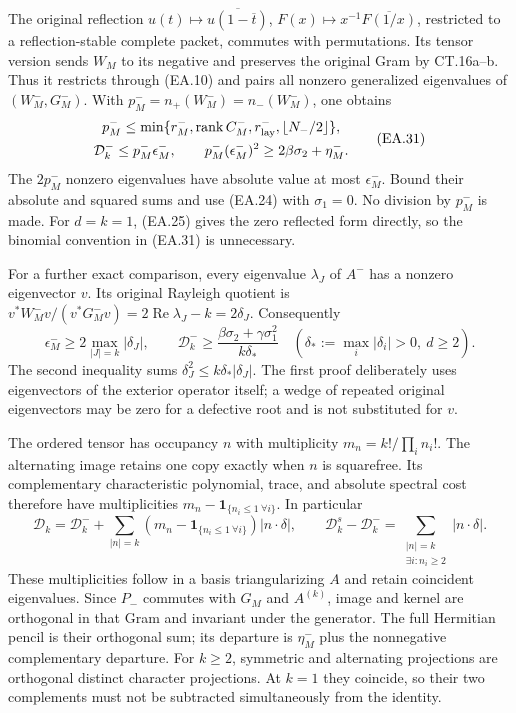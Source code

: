 The original reflection \(u(t)\mapsto\overline{u(1-\overline t)}\),
\(F(x)\mapsto x^{-1}\overline{F(1/x)}\), restricted to a
reflection-stable complete packet, commutes with permutations.  Its
tensor version sends \(W_M\) to its negative and preserves the
original Gram by CT.16a--b.  Thus it restricts through (EA.10) and
pairs all nonzero generalized eigenvalues of \((W_M^-,G_M^-)\).
With \(p_M^-=n_+(W_M^-)=n_-(W_M^-)\), one obtains
\[
 \begin{gathered}
 p_M^-\le\min\{r_M^-,\operatorname{rank}C_M^-,r_{\rm lay}^-,
                                      \lfloor N_-/2\rfloor\},\\
 \mathcal D_k^-\le p_M^-\epsilon_M^-,\qquad
 p_M^-(\epsilon_M^-)^2\ge2\beta\sigma_2+\eta_M^-.
 \end{gathered}\tag{EA.31}
\]
The \(2p_M^-\) nonzero eigenvalues have absolute value at most
\(\epsilon_M^-\).  Bound their absolute and squared sums and
use (EA.24) with \(\sigma_1=0\).  No division by \(p_M^-\)
is made.  For \(d=k=1\), (EA.25) gives the zero reflected form
directly, so the binomial convention in (EA.31) is unnecessary.

For a further exact comparison, every eigenvalue \(\lambda_J\)
of \(A^-\) has a nonzero eigenvector \(v\).  Its original
Rayleigh quotient is
\(v^*W_M^-v/(v^*G_M^-v)=2\operatorname{Re}\lambda_J-k=2\delta_J\).
Consequently
\[
 \epsilon_M^-\ge2\max_{|J|=k}|\delta_J|,
 \qquad
 \mathcal D_k^-\ge
 \frac{\beta\sigma_2+\gamma\sigma_1^2}{k\delta_*}
 \quad(\delta_*:=\max_i|\delta_i|>0,\ d\ge2).
 \tag{EA.32}
\]
The second inequality sums
\(\delta_J^2\le k\delta_*|\delta_J|\).
The first proof deliberately uses eigenvectors of the exterior operator
itself; a wedge of repeated original eigenvectors may be zero for a
defective root and is not substituted for \(v\).

The ordered tensor has occupancy \(n\) with multiplicity
\(m_n=k!/\prod_i n_i!\).  The alternating image retains one
copy exactly when \(n\) is squarefree.  Its complementary
characteristic polynomial, trace, and absolute spectral cost therefore
have multiplicities \(m_n-\mathbf1_{\{n_i\le1\ \forall i\}}\).
In particular
\[
 \mathcal D_k=\mathcal D_k^-+
 \sum_{|n|=k}(m_n-\mathbf1_{\{n_i\le1\ \forall i\}})|n\cdot\delta|,
 \qquad
 \mathcal D_k^s-\mathcal D_k^-=
             \sum_{\substack{|n|=k\\\exists i:n_i\ge2}}|n\cdot\delta|.
 \tag{EA.33}
\]
These multiplicities follow in a basis triangularizing \(A\) and retain
coincident eigenvalues.  Since \(P_-\) commutes with \(G_M\)
and \(A^{(k)}\), image and kernel are orthogonal in that Gram
and invariant under the generator.  The full Hermitian pencil is
their orthogonal sum; its departure is \(\eta_M^-\) plus the
nonnegative complementary departure.  For \(k\ge2\), symmetric
and alternating projections are orthogonal distinct character
projections.  At \(k=1\) they coincide, so their two complements
must not be subtracted simultaneously from the identity.

